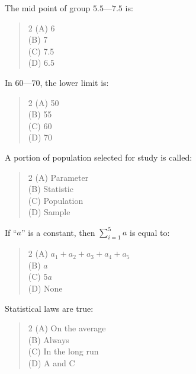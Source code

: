 \documentclass[11pt,a4paper]{article}
\begin{document}
\begin{mcqlist}
\item The mid point of group $5.5$---$7.5$ is:
\begin{quote}\begin{multicols}{2}
\noindent (A) 6 \\
(B) 7 \\
(C) 7.5 \\
(D) 6.5
\end{multicols}\end{quote}

\item In $60$---$70$, the lower limit is:
\begin{quote}\begin{multicols}{2}
\noindent (A) 50 \\
(B) 55 \\
(C) 60 \\
(D) 70
\end{multicols}\end{quote}

\item A portion of population selected for study is called:
\begin{quote}\begin{multicols}{2}
\noindent (A) Parameter \\
(B) Statistic \\
(C) Population \\
(D) Sample
\end{multicols}\end{quote}

\item If ``$a$'' is a constant, then $\displaystyle\sum_{i=1}^{5} a$ is equal to:
\begin{quote}\begin{multicols}{2}
\noindent (A) $a_1+a_2+a_3+a_4+a_5$ \\
(B) $a$ \\
(C) $5a$ \\
(D) None
\end{multicols}\end{quote}

\item Statistical laws are true:
\begin{quote}\begin{multicols}{2}
\noindent (A) On the average \\
(B) Always \\
(C) In the long run \\
(D) A and C
\end{multicols}\end{quote}


\end{mcqlist}
\end{document}
